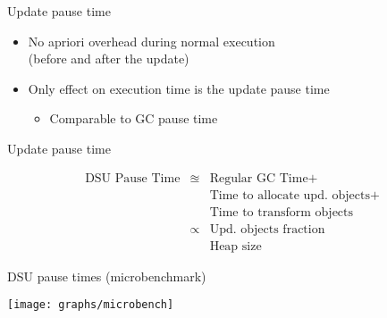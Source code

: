 \begin{frame}{Update pause time}%
\begin{itemize}
\item No apriori overhead during normal execution \\
(before and after the update)
\item Only effect on execution time is the update pause time
  \begin{itemize}
  \item Comparable to GC pause time
  \end{itemize}
\end{itemize}
\end{frame}

\begin{frame}{Update pause time}%
\begin{large}
\begin{eqnarray*}
\text{DSU Pause Time} & \approxeq & \text{Regular GC Time} + \\ 
                      &           & \text{Time to allocate upd. objects} + \\
                      &           & \text{Time to transform objects} \\
                      & \propto   & \text{Upd. objects fraction} \\
                      &           & \text{Heap size}
\end{eqnarray*}
\end{large}
\end{frame}

\begin{frame}{DSU pause times (microbenchmark)}%
\begin{center}%
\texttt{[image: graphs/microbench]}%
\end{center}%
\end{frame}
